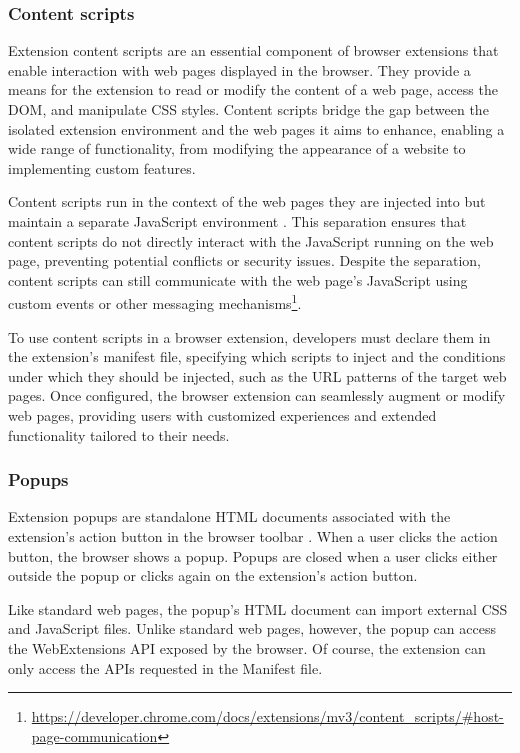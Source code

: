 \subsubsection{Content scripts}

Extension content scripts are an essential component of browser extensions that enable interaction with web pages displayed in the browser. They provide a means for the extension to read or modify the content of a web page, access the DOM, and manipulate CSS styles. Content scripts bridge the gap between the isolated extension environment and the web pages it aims to enhance, enabling a wide range of functionality, from modifying the appearance of a website to implementing custom features.

Content scripts run in the context of the web pages they are injected into but maintain a separate JavaScript environment \cite{ChromeWebExtensions}. This separation ensures that content scripts do not directly interact with the JavaScript running on the web page, preventing potential conflicts or security issues. Despite the separation, content scripts can still communicate with the web page's JavaScript using custom events or other messaging mechanisms\footnote{\url{https://developer.chrome.com/docs/extensions/mv3/content_scripts/\#host-page-communication}}.

To use content scripts in a browser extension, developers must declare them in the extension's manifest file, specifying which scripts to inject and the conditions under which they should be injected, such as the URL patterns of the target web pages. Once configured, the browser extension can seamlessly augment or modify web pages, providing users with customized experiences and extended functionality tailored to their needs.

\subsubsection{Popups}

Extension popups are standalone HTML documents associated with the extension's action button in the browser toolbar \cite{ChromeWebExtensions}. When a user clicks the action button, the browser shows a popup. Popups are closed when a user clicks either outside the popup or clicks again on the extension's action button.

Like standard web pages, the popup's HTML document can import external CSS and JavaScript files. Unlike standard web pages, however, the popup can access the WebExtensions API exposed by the browser. Of course, the extension can only access the APIs requested in the Manifest file.

